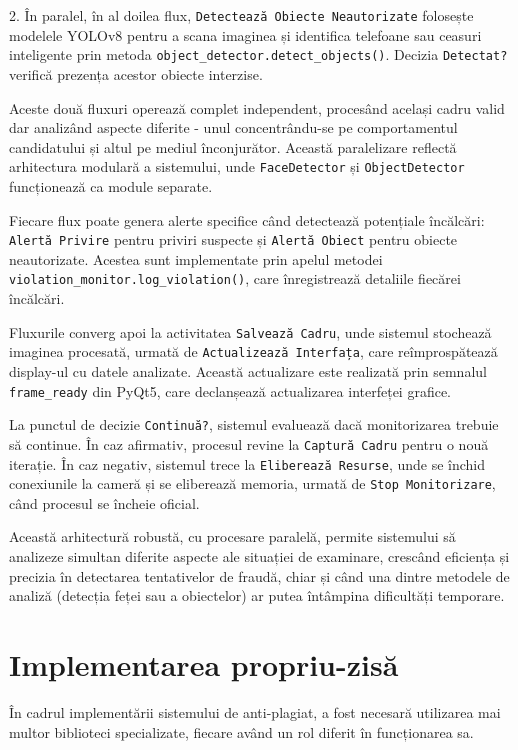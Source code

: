 \documentclass[12pt,a4paper]{article}
\begin{document}
2. În paralel, în al doilea flux, \texttt{Detectează Obiecte Neautorizate} folosește modelele YOLOv8 pentru a scana imaginea și identifica telefoane sau ceasuri inteligente prin metoda \texttt{object\_detector.detect\_objects()}. Decizia \texttt{Detectat?} verifică prezența acestor obiecte interzise.

Aceste două fluxuri operează complet independent, procesând același cadru valid dar analizând aspecte diferite - unul concentrându-se pe comportamentul candidatului și altul pe mediul înconjurător. Această paralelizare reflectă arhitectura modulară a sistemului, unde \texttt{FaceDetector} și \texttt{ObjectDetector} funcționează ca module separate.

Fiecare flux poate genera alerte specifice când detectează potențiale încălcări: \texttt{Alertă Privire} pentru priviri suspecte și \texttt{Alertă Obiect} pentru obiecte neautorizate. Acestea sunt implementate prin apelul metodei \texttt{violation\_monitor.log\_violation()}, care înregistrează detaliile fiecărei încălcări.

Fluxurile converg apoi la activitatea \texttt{Salvează Cadru}, unde sistemul stochează imaginea procesată, urmată de \texttt{Actualizează Interfața}, care reîmprospătează display-ul cu datele analizate. Această actualizare este realizată prin semnalul \texttt{frame\_ready} din PyQt5, care declanșează actualizarea interfeței grafice.

La punctul de decizie \texttt{Continuă?}, sistemul evaluează dacă monitorizarea trebuie să continue. În caz afirmativ, procesul revine la \texttt{Captură Cadru} pentru o nouă iterație. În caz negativ, sistemul trece la \texttt{Eliberează Resurse}, unde se închid conexiunile la cameră și se eliberează memoria, urmată de \texttt{Stop Monitorizare}, când procesul se încheie oficial.

Această arhitectură robustă, cu procesare paralelă, permite sistemului să analizeze simultan diferite aspecte ale situației de examinare, crescând eficiența și precizia în detectarea tentativelor de fraudă, chiar și când una dintre metodele de analiză (detecția feței sau a obiectelor) ar putea întâmpina dificultăți temporare.

\section{Implementarea propriu-zisă}

În cadrul implementării sistemului de anti-plagiat, a fost necesară utilizarea mai multor biblioteci specializate, fiecare având un rol diferit în funcționarea sa.
\end{document}
